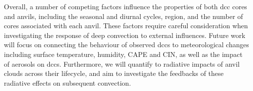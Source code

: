 Overall, a number of competing factors influence the properties of both \acrshort{dcc} cores and anvils, including the seasonal and diurnal cycles, region, and the number of cores associated with each anvil.
These factors require careful consideration when investigating the response of deep convection to external influences.
Future work will focus on connecting the behaviour of observed \acrshort{dcc}s to meteorological changes including surface temperature, humidity, CAPE and CIN, as well as the impact of aerosols on \acrshort{dcc}s.
Furthermore, we will quantify to radiative impacts of anvil clouds across their lifecycle, and aim to investigate the feedbacks of these radiative effects on subsequent convection.

